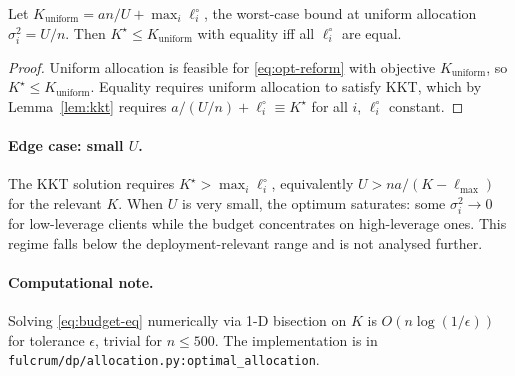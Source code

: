\begin{corollary}
\label{cor:strict-restated}
Let $K_{\mathrm{uniform}} = an/U + \max_i \ell_i^\circ$, the worst-case
bound at uniform allocation $\sigma_i^2 = U/n$. Then
\(K^\star \leq K_{\mathrm{uniform}}\) with equality iff all
$\ell_i^\circ$ are equal.
\end{corollary}
\begin{proof}
Uniform allocation is feasible for \eqref{eq:opt-reform} with
objective $K_{\mathrm{uniform}}$, so $K^\star \leq K_{\mathrm{uniform}}$.
Equality requires uniform allocation to satisfy KKT, which by
Lemma~\ref{lem:kkt} requires
$a/(U/n) + \ell_i^\circ \equiv K^\star$ for all $i$, \ie $\ell_i^\circ$
constant.
\end{proof}

\paragraph{Edge case: small $U$.}
The KKT solution requires $K^\star > \max_i \ell_i^\circ$, equivalently
$U > n a/(K - \ell_{\max})$ for the relevant $K$. When $U$ is very
small, the optimum saturates: some $\sigma_i^2 \to 0$ for low-leverage
clients while the budget concentrates on high-leverage ones. This
regime falls below the deployment-relevant range and is not analysed
further.

\paragraph{Computational note.}
Solving \eqref{eq:budget-eq} numerically via 1-D bisection on $K$ is
$O(n \log(1/\epsilon))$ for tolerance $\epsilon$, trivial for $n \leq
500$. The implementation is in
\texttt{fulcrum/dp/allocation.py:optimal\_allocation}.
